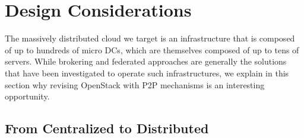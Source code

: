 \section{Design Considerations\label{sec:design}}

The massively distributed cloud we target is an infrastructure that is composed of up to hundreds of micro DCs, which are themselves composed of up to
tens of servers. While brokering and federated approaches are generally the solutions that have been investigated to operate such infrastructures, we
explain in this section why revising OpenStack with P2P mechanisms is an interesting opportunity.

\subsection{From Centralized to Distributed\label{subsec:design-arg}}

